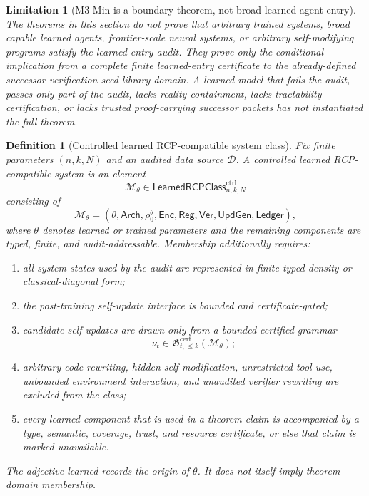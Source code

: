 \documentclass[11pt]{article}
\newtheorem{definition}[theorem]{Definition}
\newtheorem{limitation}[theorem]{Limitation}
\newcommand{\1}{\mathbf{1}}
\begin{document}
\begin{limitation}[M3-Min is a boundary theorem, not broad learned-agent entry]
\label{lim:m3_min_not_broad_entry}
The theorems in this section do not prove that arbitrary trained systems, broad capable learned agents, frontier-scale neural systems, or arbitrary self-modifying programs satisfy the learned-entry audit.  They prove only the conditional implication from a complete finite learned-entry certificate to the already-defined successor-verification seed-library domain.  A learned model that fails the audit, passes only part of the audit, lacks reality containment, lacks tractability certification, or lacks trusted proof-carrying successor packets has not instantiated the full theorem.
\end{limitation}

\begin{definition}[Controlled learned RCP-compatible system class]
\label{def:m3_min_controlled_learned_rcp_class}
Fix finite parameters \((n,k,N)\) and an audited data source \(\mathcal D\).  A controlled learned RCP-compatible system is an element
\[
\mathcal M_\theta\in\mathsf{LearnedRCPClass}_{n,k,N}^{\mathrm{ctrl}}
\]
consisting of
\[
\mathcal M_\theta=(\theta,\mathsf{Arch},\rho_0^\theta,\mathsf{Enc},\mathsf{Reg},\mathsf{Ver},\mathsf{UpdGen},\mathsf{Ledger}),
\]
where \(\theta\) denotes learned or trained parameters and the remaining components are typed, finite, and audit-addressable.  Membership additionally requires:
\begin{enumerate}[label=(\roman*),leftmargin=1.5em]
    \item all system states used by the audit are represented in finite typed density or classical-diagonal form;
    \item the post-training self-update interface is bounded and certificate-gated;
    \item candidate self-updates are drawn only from a bounded certified grammar
    \[
    \nu_t\in\mathfrak G_{t,\le k}^{\mathrm{cert}}(\mathcal M_\theta);
    \]
    \item arbitrary code rewriting, hidden self-modification, unrestricted tool use, unbounded environment interaction, and unaudited verifier rewriting are excluded from the class;
    \item every learned component that is used in a theorem claim is accompanied by a type, semantic, coverage, trust, and resource certificate, or else that claim is marked unavailable.
\end{enumerate}
The adjective learned records the origin of \(\theta\).  It does not itself imply theorem-domain membership.
\end{definition}
\end{document}
